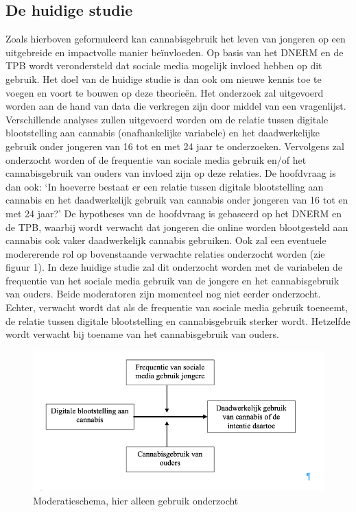 \documentclass[
  letterpaper,
  DIV=11,
  numbers=noendperiod]{scrartcl}
\begin{document}
\hypertarget{de-huidige-studie}{%
\subsection{De huidige studie}\label{de-huidige-studie}}

Zoals hierboven geformuleerd kan cannabisgebruik het leven van jongeren
op een uitgebreide en impactvolle manier beïnvloeden. Op basis van het
DNERM en de TPB wordt verondersteld dat sociale media mogelijk invloed
hebben op dit gebruik. Het doel van de huidige studie is dan ook om
nieuwe kennis toe te voegen en voort te bouwen op deze theorieën. Het
onderzoek zal uitgevoerd worden aan de hand van data die verkregen zijn
door middel van een vragenlijst. Verschillende analyses zullen
uitgevoerd worden om de relatie tussen digitale blootstelling aan
cannabis (onafhankelijke variabele) en het daadwerkelijke gebruik onder
jongeren van 16 tot en met 24 jaar te onderzoeken. Vervolgens zal
onderzocht worden of de frequentie van sociale media gebruik en/of het
cannabisgebruik van ouders van invloed zijn op deze relaties. De
hoofdvraag is dan ook: `In hoeverre bestaat er een relatie tussen
digitale blootstelling aan cannabis en het daadwerkelijk gebruik van
cannabis onder jongeren van 16 tot en met 24 jaar?' De hypotheses van de
hoofdvraag is gebaseerd op het DNERM en de TPB, waarbij wordt verwacht
dat jongeren die online worden blootgesteld aan cannabis ook vaker
daadwerkelijk cannabis gebruiken. Ook zal een eventuele modererende rol
op bovenstaande verwachte relaties onderzocht worden (zie figuur 1). In
deze huidige studie zal dit onderzocht worden met de variabelen de
frequentie van het sociale media gebruik van de jongere en het
cannabisgebruik van ouders. Beide moderatoren zijn momenteel nog niet
eerder onderzocht. Echter, verwacht wordt dat als de frequentie van
sociale media gebruik toeneemt, de relatie tussen digitale blootstelling
en cannabisgebruik sterker wordt. Hetzelfde wordt verwacht bij toename
van het cannabisgebruik van ouders.

\begin{figure}

{\centering \includegraphics{images/Screenshot1.png}

}

\caption{Moderatieschema, hier alleen gebruik onderzocht}

\end{figure}
\end{document}
